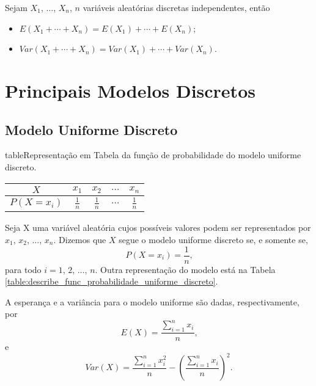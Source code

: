 \documentclass[11pt,fleqn]{book}
\numberwithin{mpicture}{chapter}
\numberwithin{mtable}{chapter}
\numberwithin{mframe}{chapter}
\begin{document}
\begin{theorem}
	Sejam $X_1$, $\dots$, $X_n$, $n$ variáveis aleatórias discretas independentes, então
	\begin{itemize}
		\item $E(X_1 + \cdots + X_n)=E(X_1) + \cdots + E(X_n)$;
		\item $Var(X_1 + \cdots + X_n)=Var(X_1) + \cdots + Var(X_n)$.
	\end{itemize}
\end{theorem}

\section{Principais Modelos Discretos}

\subsection{Modelo Uniforme Discreto}

\begin{sidepicture}{0}{table}{Representação em Tabela da função de probabilidade do modelo uniforme discreto.}
	\label{table:describe_func_probabilidade_uniforme_discreto}
	\begin{tabular}{c|cccc}\toprule  
		$X$ & $x_1$ & $x_2$ & $\dots$ & $x_n$ \\ \midrule
		$P(X=x_i)$ & $\frac{1}{n}$ & $\frac{1}{n}$ & $\dots$ & $\frac{1}{n}$\\\bottomrule
	\end{tabular}
\end{sidepicture}

Seja X uma variável aleatória cujos possíveis valores podem ser representados por $x_1$, $x_2$, $\dots$, $x_n$. Dizemos que $X$ segue o modelo uniforme discreto se, e somente se,
\begin{equation}
	P(X=x_i)=\frac{1}{n}\text{,}
\end{equation}
para todo $i=1$, $2$, $\dots$, $n$. Outra representação do modelo está na Tabela \ref{table:describe_func_probabilidade_uniforme_discreto}.

A esperança e a variância para o modelo uniforme são dadas, respectivamente, por
\begin{equation}
	E(X)=\frac{\displaystyle\sum_{i=1}^{n}x_i}{n}\text{,}
\end{equation}
e
\begin{equation}
	Var(X)=\frac{\displaystyle\sum_{i=1}^{n} x_i^2}{n} - \left (
		\frac{\displaystyle \sum_{i=1}^{n} x_i}{n}
	\right )^2\text{.}
\end{equation}
\end{document}
